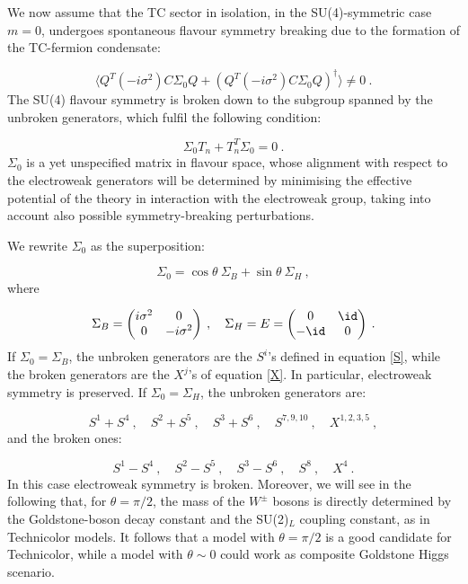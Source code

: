 We now assume that the TC sector in isolation, in the SU(4)-symmetric case $m=0$, undergoes spontaneous flavour symmetry breaking due to the formation of the TC-fermion condensate:

\begin{equation}
\langle Q^T(-i \sigma^2) C \Sigma_0 Q + (Q^T(-i \sigma^2) C \Sigma_0 Q)^{\dagger} \rangle \neq 0 \: .
\end{equation}
%
The SU(4) flavour symmetry is broken down to the subgroup spanned by the  unbroken generators, which fulfil the following condition:

\begin{equation}
 \Sigma_0 T_n + T_n^T \Sigma_0  = 0 \: .
\end{equation}
%
$\Sigma_0$ is a yet unspecified matrix in flavour space, whose alignment with respect to the electroweak generators will be determined by minimising the effective potential of the theory in interaction with the electroweak group, taking into account also possible symmetry-breaking perturbations. 

 We rewrite $\Sigma_0$ as  the superposition:

\begin{equation}
\Sigma_0 = \cos \theta \:  \Sigma_B + \sin \theta \: \Sigma_H \: ,
\end{equation}
%
where 

\begin{equation}
\Sigma_B =
\begin{pmatrix}
i \sigma^2 & 0 \\
0 & -i \sigma^2
\end{pmatrix} \:  , \quad
\Sigma_H = E =
\begin{pmatrix}
0 & \id \\
-\id &  0 
\end{pmatrix} \: . 
\end{equation}
%
If $\Sigma_0 = \Sigma_B$, the unbroken generators are the $S^i$'s defined in equation \ref{S}, while the broken generators are the $ X ^j$'s of equation \ref{X}. In particular,  electroweak symmetry is preserved.  If $\Sigma_0 = \Sigma_H$, the unbroken generators are:

\begin{equation}
S^1 + S^4 \: , \quad S^2 + S^5 \: , \quad S^3 + S^6 \: , \quad S^{7,9,10} \: , \quad X^{1, 2 ,3, 5} \: ,
\end{equation}
%
and the broken ones:

\begin{equation}
S^1 - S^4 \: , \quad S^2 - S^5 \: , \quad S^3 - S^6 \: , \quad S^8 \: , \quad  X^4  \: .
\end{equation}
%
In this case electroweak symmetry is broken. Moreover, we will see in  the following that, for $\theta = \pi/2$, the mass of the $W^{\pm}$ bosons is directly determined by the Goldstone-boson decay constant and the SU(2)$_L$ coupling constant, as in Technicolor models. It follows that a model with $\theta = \pi/2$ is a good candidate for Technicolor, while a model with $\theta \sim 0$ could work as composite Goldstone Higgs scenario.

